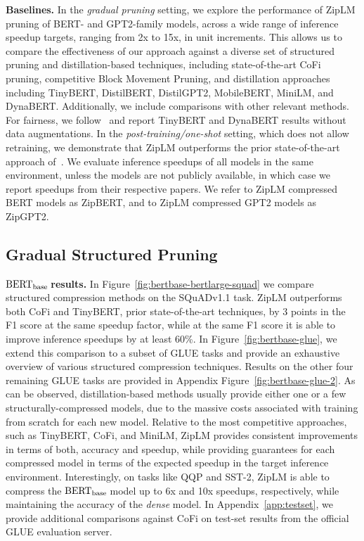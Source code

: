 \documentclass{article}
\newcommand{\bertbase}{$\textrm{BERT}_{\small{\textrm{base}}}\,$}
\newcommand{\ourmethod}{ZipLM}
\theoremstyle{plain}
\theoremstyle{definition}
\theoremstyle{remark}
\renewcommand{\paragraph}[1]{ \noindent \textbf{#1}}
\begin{document}
\paragraph{Baselines.} In the \emph{gradual pruning} setting, we explore the performance of ZipLM pruning of BERT- and GPT2-family models, across a wide range of inference speedup targets, ranging from 2x to 15x, in unit increments. This allows us to compare the effectiveness of our approach against a diverse set of structured pruning and distillation-based techniques, including state-of-the-art CoFi pruning, competitive Block Movement Pruning, 
and distillation approaches including TinyBERT, DistilBERT, DistilGPT2, MobileBERT, MiniLM, and DynaBERT. 
Additionally, we include comparisons with other relevant methods. 
For fairness, we follow~\cite{xia2022structured} and report TinyBERT and DynaBERT results without data augmentations. In the \emph{post-training/one-shot} setting, which does not allow retraining, we demonstrate that ZipLM outperforms the prior state-of-the-art approach of~\cite{kwon2022fast}.
We evaluate inference speedups of all models in the same environment, unless the models are not publicly available, in which case we report speedups from their respective papers. We refer to ZipLM compressed BERT models as ZipBERT, and to ZipLM compressed GPT2 models as ZipGPT2.


\subsection{Gradual Structured Pruning}

\paragraph{\bertbase results.} In Figure~\ref{fig:bertbase-bertlarge-squad} we compare structured compression methods on the SQuADv1.1 task. \ourmethod{} outperforms both CoFi and TinyBERT, prior state-of-the-art techniques, by 3 points in the F1 score at the same speedup factor, while at the same F1 score it is able to improve inference speedups by at least 60\%. In Figure~\ref{fig:bertbase-glue}, we extend this comparison to a subset of GLUE tasks and provide an exhaustive overview of various structured compression techniques. Results on the other four remaining GLUE tasks are provided in Appendix Figure~\ref{fig:bertbase-glue-2}. As can be observed, distillation-based methods usually provide either one or a few structurally-compressed models, due to the massive costs associated with training from scratch for each new model. 
Relative to the most competitive approaches, such as TinyBERT, CoFi, and MiniLM, \ourmethod{} provides consistent improvements in terms of both, accuracy and speedup, while providing guarantees for each compressed model in terms of the expected speedup in the target inference environment. Interestingly, on tasks like QQP and SST-2, \ourmethod{} is able to compress the \bertbase model up to 6x and 10x speedups, respectively, while maintaining the accuracy of the \emph{dense} model. In Appendix~\ref{app:testset}, we provide additional comparisons against CoFi on test-set results from the official GLUE evaluation server.
\end{document}

